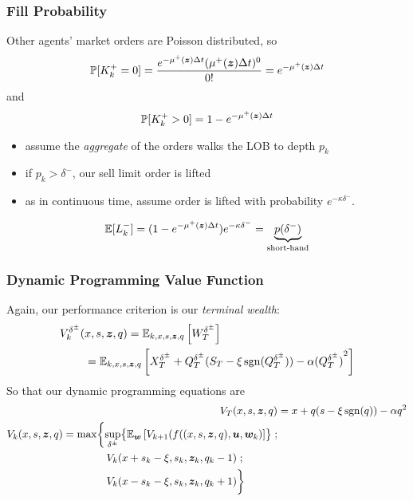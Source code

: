 \begin{frame}
\frametitle{Fill Probability}
Other agents' market orders are Poisson distributed, so
\[ \mathbb{P} [ K_k^+ = 0] = \frac{e^{-\mu^+ (\bm{z}) \Delta t} (\mu^+ (\bm{z}) \Delta t)^0}{0!} = e^{-\mu^+ (\bm{z}) \Delta t} \]
and
\[ \mathbb{P} [ K_k^+ > 0] = 1 - e^{-\mu^+ (\bm{z}) \Delta t} \]
\begin{itemize}
\item assume the \textit{aggregate} of the orders walks the LOB to depth $p_k$
\item if $p_k > \delta^-$, our sell limit order is lifted
\item as in continuous time, assume order is lifted with probability $e^{-\kappa \delta^-}$.
\end{itemize}
\[ \mathbb{E} [ L_k^- ] = ( 1 - e^{-\mu^+ (\bm{z}) \Delta t} ) e^{-\kappa \delta^-} = \underbrace{p(\delta^-)}_{\text{short-hand}} \]
\end{frame}

\begin{frame}
\frametitle{Dynamic Programming Value Function}
Again, our performance criterion is our \emph{terminal wealth}:
\[
\begin{aligned}
V_k^{\delta^\pm} (& x,s,\bm{z},q) = \mathbb{E}_{k,x,s,\bm{z},q} \left[ W_T^{\delta^\pm} \right] \\ & = \mathbb{E}_{k,x,s,\bm{z},q}\left[ X_T^{\delta^\pm} + Q_T^{\delta^\pm}(S_T - \xi\operatorname{\mathrm{sgn}}(Q_T^{\delta^\pm})) - \alpha {(Q_T^{\delta^\pm})}^2 \right]
\end{aligned}
\]
So that our dynamic programming equations are
\begin{align*}
V_T (x,s,\bz,q) & = x + q(s-\xi\sgn(q)) - \alpha q^2 \\
\begin{split}
V_k (x,s,\bz,q) & = \max \biggl\lbrace \sup_{\delta^\pm} \bigl\lbrace \E_{\bw} \left[ V_{k+1} (f((x,s,\bz,q),\bu,\bw_k) \right] \bigr\rbrace \; ; \\
& \hphantom{{}={} \max \biggl\lbrace} V_k(x+s_k-\xi,s_k, \bz_k, q_k -1) \; ; \\
& \hphantom{{}={} \max \biggl\lbrace} V_k(x-s_k-\xi,s_k, \bz_k, q_k +1) \biggr\rbrace
\end{split}
\end{align*}
\end{frame}

